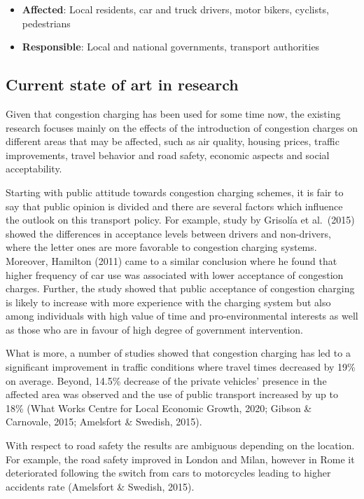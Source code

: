 \documentclass[
]{book}
\providecommand{\tightlist}{%
  \setlength{\itemsep}{0pt}\setlength{\parskip}{0pt}}
\begin{document}
\begin{itemize}
\tightlist
\item
  \textbf{Affected}: Local residents, car and truck drivers, motor bikers, cyclists, pedestrians
\item
  \textbf{Responsible}: Local and national governments, transport authorities
\end{itemize}

\hypertarget{current-state-of-art-in-research-4}{%
\subsection*{Current state of art in research}\label{current-state-of-art-in-research-4}}

Given that congestion charging has been used for some time now, the existing research focuses mainly on the effects of the introduction of congestion charges on different areas that may be affected, such as air quality, housing prices, traffic improvements, travel behavior and road safety, economic aspects and social acceptability.

Starting with public attitude towards congestion charging schemes, it is fair to say that public opinion is divided and there are several factors which influence the outlook on this transport policy. For example, study by Grisolía et al.~(2015) showed the differences in acceptance levels between drivers and non-drivers, where the letter ones are more favorable to congestion charging systems. Moreover, Hamilton (2011) came to a similar conclusion where he found that higher frequency of car use was associated with lower acceptance of congestion charges. Further, the study showed that public acceptance of congestion charging is likely to increase with more experience with the charging system but also among individuals with high value of time and pro-environmental interests as well as those who are in favour of high degree of government intervention.

What is more, a number of studies showed that congestion charging has led to a significant improvement in traffic conditions where travel times decreased by 19\% on average. Beyond, 14.5\% decrease of the private vehicles' presence in the affected area was observed and the use of public transport increased by up to 18\% (What Works Centre for Local Economic Growth, 2020; Gibson \& Carnovale, 2015; Amelsfort \& Swedish, 2015).

With respect to road safety the results are ambiguous depending on the location. For example, the road safety improved in London and Milan, however in Rome it deteriorated following the switch from cars to motorcycles leading to higher accidents rate (Amelsfort \& Swedish, 2015).
\end{document}

